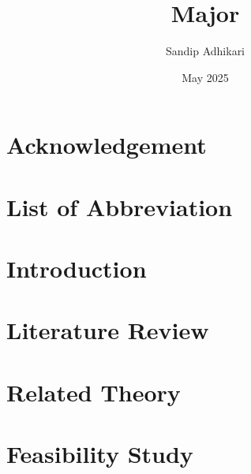 \documentclass[12pt,a4paper]{report}
\title{Major}
\author{Sandip Adhikari}
\date{May 2025}
\begin{document}



\chapter*{Acknowledgement}
\label{acknowledgement}


%

\tableofcontents
\thispagestyle{empty}
\addtocounter{page}{-1}
\newpage

\listoffigures
{}
\newpage

\listoftables
{}
\newpage

\chapter*{List of Abbreviation}
\label{abbreviation}

\newpage


\chapter{Introduction}
\label{introduction}


\chapter{Literature Review}
\label{literaturereview}


\chapter{Related Theory}
\label{relatedtheory}


\chapter{Feasibility Study}
\label{feasiblity}

\end{document}
